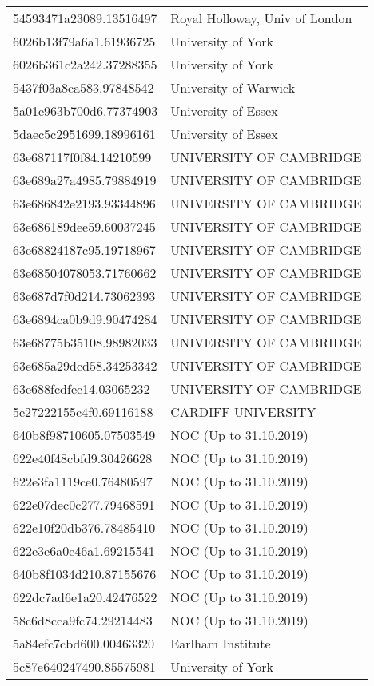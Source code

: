 \begin{tabular}{ll}
54593471a23089.13516497 & Royal Holloway, Univ of London \\
6026b13f79a6a1.61936725 & University of York \\
6026b361c2a242.37288355 & University of York \\
5437f03a8ca583.97848542 & University of Warwick \\
5a01e963b700d6.77374903 & University of Essex \\
5daec5c2951699.18996161 & University of Essex \\
63e687117f0f84.14210599 & UNIVERSITY OF CAMBRIDGE \\
63e689a27a4985.79884919 & UNIVERSITY OF CAMBRIDGE \\
63e686842e2193.93344896 & UNIVERSITY OF CAMBRIDGE \\
63e686189dee59.60037245 & UNIVERSITY OF CAMBRIDGE \\
63e68824187c95.19718967 & UNIVERSITY OF CAMBRIDGE \\
63e68504078053.71760662 & UNIVERSITY OF CAMBRIDGE \\
63e687d7f0d214.73062393 & UNIVERSITY OF CAMBRIDGE \\
63e6894ca0b9d9.90474284 & UNIVERSITY OF CAMBRIDGE \\
63e68775b35108.98982033 & UNIVERSITY OF CAMBRIDGE \\
63e685a29dcd58.34253342 & UNIVERSITY OF CAMBRIDGE \\
63e688fcdfec14.03065232 & UNIVERSITY OF CAMBRIDGE \\
5e27222155c4f0.69116188 & CARDIFF UNIVERSITY \\
640b8f98710605.07503549 & NOC (Up to 31.10.2019) \\
622e40f48cbfd9.30426628 & NOC (Up to 31.10.2019) \\
622e3fa1119ce0.76480597 & NOC (Up to 31.10.2019) \\
622e07dec0c277.79468591 & NOC (Up to 31.10.2019) \\
622e10f20db376.78485410 & NOC (Up to 31.10.2019) \\
622e3e6a0e46a1.69215541 & NOC (Up to 31.10.2019) \\
640b8f1034d210.87155676 & NOC (Up to 31.10.2019) \\
622dc7ad6e1a20.42476522 & NOC (Up to 31.10.2019) \\
58c6d8cca9fc74.29214483 & NOC (Up to 31.10.2019) \\
5a84efc7cbd600.00463320 & Earlham Institute \\
5c87e640247490.85575981 & University of York \\

\end{tabular}
